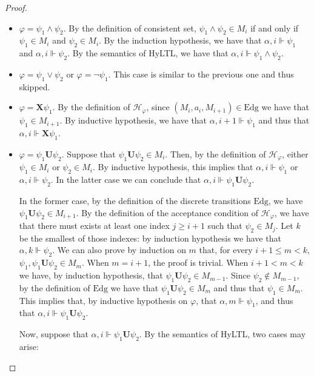 \documentclass[submission,copyright,creativecommons]{eptcs}
\newcommand{\hyltl}{\textsf{HyLTL}\xspace}
\newcommand{\X}{\ensuremath{\mathbin{\mathbf{X}}}\xspace}
\newcommand{\U}{\ensuremath{\mathbin{\mathbf{U}}}\xspace}
\newcommand{\mmodels}{\Vdash}
\newcommand{\autH}{\mathcal{H}}
\newcommand{\Edg}{\mathrm{Edg}}
\begin{document}
\begin{proof}
\begin{itemize}
	\item $\varphi = \psi_1 \land \psi_2$. By the definition of consistent set, $\psi_1 \land \psi_2 \in M_i$ if and only if $\psi_1 \in M_i$ and $\psi_2 \in M_i$. By the induction hypothesis, we have that $\alpha,i \mmodels \psi_1$ and $\alpha,i \mmodels \psi_2$. By the semantics of \hyltl, we have that $\alpha,i \mmodels \psi_1 \land \psi_2$.
	
	\item $\varphi = \psi_1 \lor \psi_2$ or $\varphi = \neg\psi_1$. This case is similar to the previous one and thus skipped.
	
	\item $\varphi = \X\psi_1$. By the definition of $\autH_\varphi$, since $(M_i, a_i, M_{i+1}) \in \Edg$ we have that $\psi_1\in M_{i+1}$. By inductive hypothesis, we have that $\alpha,{i+1} \mmodels \psi_1$ and thus that $\alpha,i \mmodels \X\psi_1$.



	\item $\varphi = \psi_1\U\psi_2$. Suppose that $\psi_1\U\psi_2 \in M_i$. Then, by the definition of $\autH_\varphi$, either $\psi_1 \in M_i$ or $\psi_2 \in M_i$. By inductive hypothesis, this implies that $\alpha,i \mmodels \psi_1$ or $\alpha,i \mmodels \psi_2$. In the latter case we can conclude that $\alpha,i\mmodels \psi_1\U\psi_2$.
	
	In the former case, by the definition of the discrete transitions $\Edg$, we have $\psi_1\U\psi_2 \in M_{i+1}$. By the definition of the acceptance condition of $\autH_\varphi$, we have that there must exists at least one index $j\geq i+1$ such that $\psi_2 \in M_j$. Let $k$ be the smallest of those indexes: by induction hypothesis we have that $\alpha,{k}\mmodels\psi_2$. We can also prove by induction on $m$ that, for every $i+1 \leq m < k$, $\psi_1, \psi_1\U\psi_2 \in  M_m$. When $m = i+1$, the proof is trivial. When $i+1 < m < k$ we have, by induction hypothesis, that $\psi_1\U\psi_2 \in M_{m-1}$. Since $\psi_2\not\in M_{m-1}$, by the definition of $\Edg$ we have that $\psi_1\U\psi_2\in M_m$ and thus that $\psi_1 \in M_m$. This implies that, by inductive hypothesis on $\varphi$, that $\alpha,m \mmodels \psi_1$, and thus that $\alpha,i \mmodels \psi_1\U\psi_2$.

	Now, suppose that $\alpha,i \mmodels \psi_1 \U \psi_2$. By the semantics of \hyltl, two cases may arise:
	

\end{itemize}
\end{proof}
\end{document}
